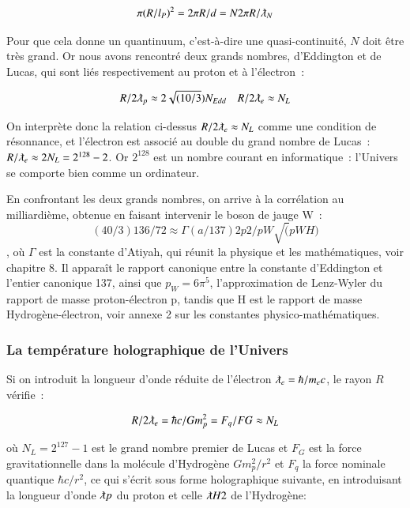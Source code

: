 \documentclass[a4paper,12pt]{article}
\begin{document}
\begin{equation}
\pi (R/l_P)^2 = 2 \pi R/d  = N 2\pi R/\lambdabar_N 
\end{equation}


Pour que cela donne un quantinuum, c'est-à-dire une quasi-continuité, $ N$ doit être très grand. Or nous avons rencontré deux grands nombres, d'Eddington et de Lucas, qui sont liés respectivement au proton et à l'électron :


\begin{equation}
R/2\lambdabar_p \approx 2\sqrt{(10/3})N_{Edd}     ~~~~   R/2\lambdabar_e \approx N_L 
\end{equation}



On interprète donc la relation ci-dessus $R/2\lambdabar_e \approx N_L$ comme une condition de résonnance, et l'électron est associé au double du grand nombre de Lucas : $R/\lambdabar_e \approx 2 N_L = 2^{128}-2$. Or $2^{128}$ est un nombre courant en informatique : l'Univers se comporte bien comme un ordinateur.

En confrontant les deux grands nombres, on arrive à la corrélation au milliardième, obtenue en faisant intervenir le boson de jauge W : 
\begin{equation}
(40/3)136/72 \approx \Gamma(a/137)2 p2/pW\sqrt(pW H)
\end{equation}, où $\Gamma$ est  la constante d'Atiyah, qui réunit la physique et les mathématiques, voir chapitre 8. Il apparaît le rapport canonique entre la constante d'Eddington et l'entier canonique 137, ainsi que $p_W = 6\pi^5$, l'approximation de Lenz-Wyler du rapport de masse proton-électron p, tandis que H est le rapport de masse Hydrogène-électron, voir annexe 2 sur les constantes physico-mathématiques. 


\subsubsection{La température holographique de l'Univers }

     Si on introduit la longueur d'onde réduite de l'électron $\lambdabar_e =  \hbar/m_ec$, le rayon $R$ vérifie :

\begin{equation}
R/2\lambdabar_e = \hbar c/Gm_p^2 = F_q/FG \approx N_L
\end{equation}


où $N_L = 2^{127}-1$ est le grand nombre premier de Lucas et $F_G$ est la force gravitationnelle dans la molécule d'Hydrogène $Gm_p^2/r^2$ et $F_q$ la force nominale quantique $\hbar c/r^2$, ce qui s'écrit sous forme holographique suivante, en introduisant la longueur d'onde $\lambdabar p$ du proton et celle $\lambdabar H2$ de l'Hydrogène:
\end{document}
